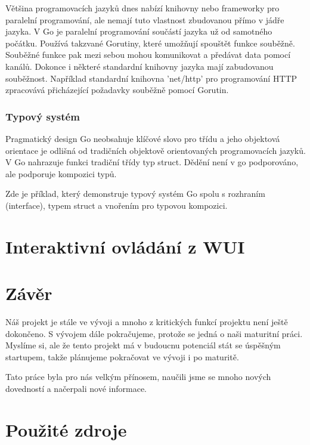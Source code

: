 \documentclass[12pt,a4paper]{article}
\begin{document}
Většina programovacích jazyků dnes nabízí knihovny nebo frameworky pro
paralelní programování, ale nemají tuto vlastnost zbudovanou přímo v jádře
jazyka. V Go je paralelní programování součástí jazyka už od samotného počátku.
Používá takzvané Gorutiny, které umožňují spouštět funkce souběžně. Souběžné
funkce pak mezi sebou mohou komunikovat a předávat data pomocí kanálů. Dokonce
i některé standardní knihovny jazyka mají zabudovanou souběžnost. Například
standardní knihovna 'net/http' pro programování HTTP zpracovává přicházející
požadavky souběžně pomocí Gorutin.

\subsubsection{Typový systém}

Pragmatický design Go neobsahuje klíčové slovo pro třídu a jeho objektová
orientace je odlišná od tradičních objektově orientovaných programovacích
jazyků. V Go nahrazuje funkci tradiční třídy typ struct. Dědění není v go
podporováno, ale podporuje kompozici typů.

Zde je příklad, který demonstruje typový systém Go spolu s rozhraním
(interface), typem struct a vnořením pro typovou kompozici.


\clearpage

\section{Interaktivní ovládání z WUI}

\clearpage

\section{Závěr}

Náš projekt je stále ve vývoji a mnoho z kritických funkcí projektu není ještě
dokončeno. S vývojem dále pokračujeme, protože se jedná o naši maturitní práci.
Myslíme si, ale že tento projekt má v budoucnu potenciál stát se úspěšným
startupem, takže plánujeme pokračovat ve vývoji i po maturitě.

Tato práce byla pro nás velkým přínosem, naučili jsme se mnoho nových
dovedností a načerpali nové informace.


\clearpage

\section{Použité zdroje}
\end{document}
